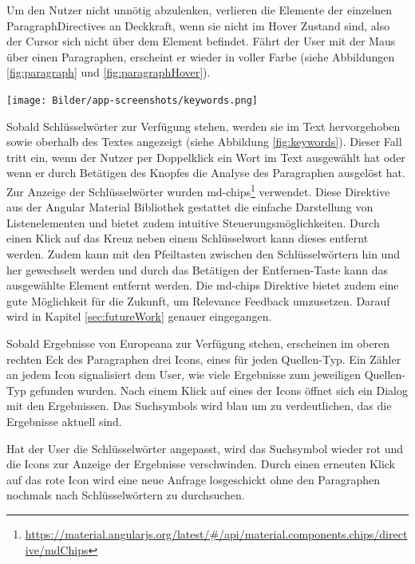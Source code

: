  Um den Nutzer nicht unnötig abzulenken, verlieren die Elemente der einzelnen ParagraphDirectives an Deckkraft, wenn sie nicht im Hover Zustand sind, also der Cursor sich nicht über dem Element befindet. Fährt der User mit der Maus über einen Paragraphen, erscheint er wieder in voller Farbe (siehe Abbildungen \ref{fig:paragraph} und \ref{fig:paragraphHover}).

 \begin{minipage}{\linewidth}
	\centering
	\vspace*{0.5cm}
	\texttt{[image: Bilder/app-screenshots/keywords.png]}
	\label{fig:keywords}
	\vspace*{0.5cm}
 \end{minipage}

 Sobald Schlüsselwörter zur Verfügung stehen, werden sie im Text hervorgehoben sowie oberhalb des Textes angezeigt (siehe Abbildung \ref{fig:keywords}). Dieser Fall tritt ein, wenn der Nutzer per Doppelklick ein Wort im Text ausgewählt hat oder wenn er durch Betätigen des Knopfes die Analyse des Paragraphen ausgelöst hat. Zur Anzeige der Schlüsselwörter wurden md-chips\footnote{\url{https://material.angularjs.org/latest/\#/api/material.components.chips/directive/mdChips}} verwendet. Diese Direktive aus der Angular Material Bibliothek gestattet die einfache Darstellung von Listenelementen und bietet zudem intuitive Steuerungsmöglichkeiten. Durch einen Klick auf das Kreuz neben einem Schlüsselwort kann dieses entfernt werden. Zudem kann mit den Pfeiltasten zwischen den Schlüsselwörtern hin und her gewechselt werden und durch das Betätigen der Entfernen-Taste kann das ausgewählte Element entfernt werden. Die md-chips Direktive bietet zudem eine gute Möglichkeit für die Zukunft, um Relevance Feedback umzusetzen. Darauf wird in Kapitel \ref{sec:futureWork} genauer eingegangen.

 Sobald Ergebnisse von Europeana zur Verfügung stehen, erscheinen im oberen rechten Eck des Paragraphen drei Icons, eines für jeden Quellen-Typ. Ein Zähler an jedem Icon signalisiert dem User, wie viele Ergebnisse zum jeweiligen Quellen-Typ gefunden wurden. Nach einem Klick auf eines der Icons öffnet sich ein Dialog mit den Ergebnissen. Das Suchsymbols wird blau um zu verdeutlichen, das die Ergebnisse aktuell sind.

 Hat der User die Schlüsselwörter angepasst, wird das Suchsymbol wieder rot und die Icons zur Anzeige der Ergebnisse verschwinden. Durch einen erneuten Klick auf das rote Icon wird eine neue Anfrage losgeschickt ohne den Paragraphen nochmals nach Schlüsselwörtern zu durchsuchen.

